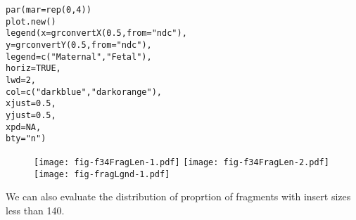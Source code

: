 \documentclass{article}\usepackage[]{graphicx}\usepackage[]{color}
\makeatletter
\newcommand{\hlnum}[1]{\textcolor[rgb]{0.063,0.58,0.627}{#1}}%
\newcommand{\hlstr}[1]{\textcolor[rgb]{0.063,0.58,0.627}{#1}}%
\newcommand{\hlstd}[1]{\textcolor[rgb]{0.196,0.196,0.196}{#1}}%
\newcommand{\hlkwc}[1]{\textcolor[rgb]{0,0.631,0.314}{#1}}%
\newcommand{\hlkwd}[1]{\textcolor[rgb]{0.78,0.227,0.412}{#1}}%
\newenvironment{kframe}{%
 \def\at@end@of@kframe{}%
 \ifinner\ifhmode%
  \def\at@end@of@kframe{\end{minipage}}%
  \begin{minipage}{\columnwidth}%
 \fi\fi%
 \def\FrameCommand##1{\hskip\@totalleftmargin \hskip-\fboxsep
 \colorbox{shadecolor}{##1}\hskip-\fboxsep
     \hskip-\linewidth \hskip-\@totalleftmargin \hskip\columnwidth}%
 \MakeFramed {\advance\hsize-\width
   \@totalleftmargin\z@ \linewidth\hsize
   \@setminipage}}%
 {\par\unskip\endMakeFramed%
 \at@end@of@kframe}
\newenvironment{knitrout}{}{} %
\makeatother
\begin{document}
\begin{knitrout}
\color{fgcolor}\begin{kframe}
\begin{alltt}
\hlkwd{par}\hlstd{(}\hlkwc{mar} \hlstd{=} \hlkwd{rep}\hlstd{(}\hlnum{0}\hlstd{,} \hlnum{4}\hlstd{))}
\hlkwd{plot.new}\hlstd{()}
\hlkwd{legend}\hlstd{(}\hlkwc{x} \hlstd{=} \hlkwd{grconvertX}\hlstd{(}\hlnum{0.5}\hlstd{,} \hlkwc{from} \hlstd{=} \hlstr{"ndc"}\hlstd{),}
       \hlkwc{y} \hlstd{=} \hlkwd{grconvertY}\hlstd{(}\hlnum{0.5}\hlstd{,} \hlkwc{from} \hlstd{=} \hlstr{"ndc"}\hlstd{),}
       \hlkwc{legend} \hlstd{=} \hlkwd{c}\hlstd{(}\hlstr{"Maternal"}\hlstd{,} \hlstr{"Fetal"}\hlstd{),}
       \hlkwc{horiz} \hlstd{=} \hlnum{TRUE}\hlstd{,}
       \hlkwc{lwd} \hlstd{=} \hlnum{2}\hlstd{,}
       \hlkwc{col} \hlstd{=} \hlkwd{c}\hlstd{(}\hlstr{"darkblue"}\hlstd{,} \hlstr{"darkorange"}\hlstd{),}
       \hlkwc{xjust} \hlstd{=} \hlnum{0.5}\hlstd{,}
       \hlkwc{yjust} \hlstd{=} \hlnum{0.5}\hlstd{,}
       \hlkwc{xpd} \hlstd{=} \hlnum{NA}\hlstd{,}
       \hlkwc{bty} \hlstd{=} \hlstr{"n"}\hlstd{)}
\end{alltt}
\end{kframe}
\end{knitrout}

\begin{figure}
  \centering
  \texttt{[image: fig-f34FragLen-1.pdf]}%
  \texttt{[image: fig-f34FragLen-2.pdf]}
  \texttt{[image: fig-fragLgnd-1.pdf]}
\end{figure}

We can also evaluate the distribution of proprtion of fragments with insert sizes less than 140.
\end{document}
